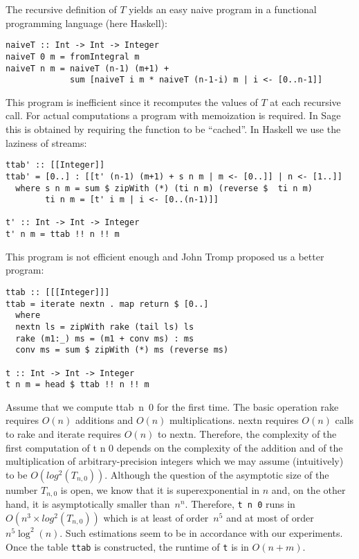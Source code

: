 \documentclass{jfp1}
\begin{document}
The recursive definition of $T$ yields an easy naive program in a functional
programming language (here \textsf{Haskell}):
\begin{verbatim}
naiveT :: Int -> Int -> Integer
naiveT 0 m = fromIntegral m
naiveT n m = naiveT (n-1) (m+1) + 
             sum [naiveT i m * naiveT (n-1-i) m | i <- [0..n-1]]
\end{verbatim}
This program is inefficient since it recomputes the values of $T$ at each recursive
call.   For actual computations a program with memoization is required.  In
\textsf{Sage}  this is obtained by requiring the function to be ``cached''. In
\textsf{Haskell} we use the laziness of streams:
\begin{verbatim}
ttab' :: [[Integer]]
ttab' = [0..] : [[t' (n-1) (m+1) + s n m | m <- [0..]] | n <- [1..]]
  where s n m = sum $ zipWith (*) (ti n m) (reverse $  ti n m)
        ti n m = [t' i m | i <- [0..(n-1)]]

t' :: Int -> Int -> Integer
t' n m = ttab !! n !! m
\end{verbatim}
This program is not efficient enough and John Tromp proposed us a better program:
\begin{verbatim}
ttab :: [[[Integer]]]
ttab = iterate nextn . map return $ [0..] 
  where
  nextn ls = zipWith rake (tail ls) ls
  rake (m1:_) ms = (m1 + conv ms) : ms
  conv ms = sum $ zipWith (*) ms (reverse ms)
  
t :: Int -> Int -> Integer
t n m = head $ ttab !! n !! m
\end{verbatim}
Assume that we compute \textsf{ttab~n~0} for the first time.  The basic operation
\textsf{rake} requires $O(n)$ additions and $O(n)$ multiplications. \textsf{nextn}
requires $O(n)$ calls to \textsf{rake} and \textsf{iterate} requires  $O(n)$ to \textsf{nextn}.
Therefore, the complexity
of the first computation of \textsf{t n 0} depends on the complexity of the addition
and of the multiplication of arbitrary-precision integers which we may assume (intuitively) to be
$O(log^2(T_{n,0}))$. Although the question of the asymptotic size of the number
$T_{n,0}$ is open, we know that it is superexponential in $n$ and, on the other hand,
it is asymptotically smaller than~$n^n$. Therefore, \texttt{t n 0} runs in
$O(n^3\times log^2(T_{n,0}))$ which is at least of order~$n^5$ and at most of
order~$n^5 \log^2 (n)$.  Such estimations seem to be in accordance with our
experiments.  Once the table \texttt{ttab} is constructed, the runtime of \texttt{t}
is in $O(n+m)$.
\end{document}
